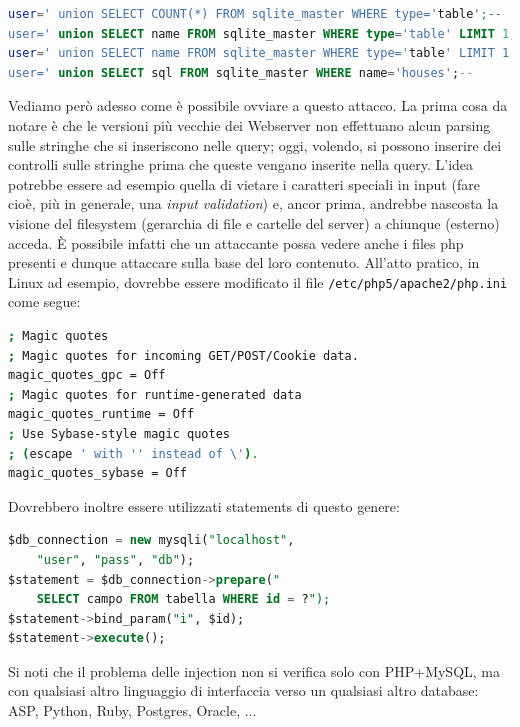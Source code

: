 \begin{lstlisting}[language=sql]
user=' union SELECT COUNT(*) FROM sqlite_master WHERE type='table';--
user=' union SELECT name FROM sqlite_master WHERE type='table' LIMIT 1;--
user=' union SELECT name FROM sqlite_master WHERE type='table' LIMIT 1 OFFSET 1;--
user=' union SELECT sql FROM sqlite_master WHERE name='houses';--
\end{lstlisting}
Vediamo però adesso come è possibile ovviare a questo attacco. La prima cosa da notare è che le versioni più vecchie dei Webserver non effettuano alcun parsing sulle stringhe che si inseriscono nelle query; oggi, volendo, si possono inserire dei controlli sulle stringhe prima che queste vengano inserite nella query. L'idea potrebbe essere ad esempio quella di vietare i caratteri speciali in input (fare cioè, più in generale, una \textit{input validation}) e, ancor prima, andrebbe nascosta la visione del filesystem (gerarchia di file e cartelle del server) a chiunque (esterno) acceda. È possibile infatti che un attaccante possa vedere anche i files php presenti e dunque attaccare sulla base del loro contenuto. All'atto pratico, in Linux ad esempio, dovrebbe essere modificato il file \texttt{/etc/php5/apache2/php.ini} come segue:
\begin{lstlisting}[language=bash]
; Magic quotes
; Magic quotes for incoming GET/POST/Cookie data.
magic_quotes_gpc = Off
; Magic quotes for runtime-generated data
magic_quotes_runtime = Off
; Use Sybase-style magic quotes
; (escape ' with '' instead of \').
magic_quotes_sybase = Off
\end{lstlisting}
Dovrebbero inoltre essere utilizzati statements di questo genere:
\begin{lstlisting}[language=sql]
$db_connection = new mysqli("localhost",
	"user", "pass", "db");
$statement = $db_connection->prepare("
	SELECT campo FROM tabella WHERE id = ?");
$statement->bind_param("i", $id);
$statement->execute();
\end{lstlisting}
Si noti che il problema delle injection non si verifica solo con PHP+MySQL, ma con qualsiasi altro linguaggio di interfaccia verso un qualsiasi altro database: ASP, Python, Ruby, Postgres, Oracle, $\dots$

